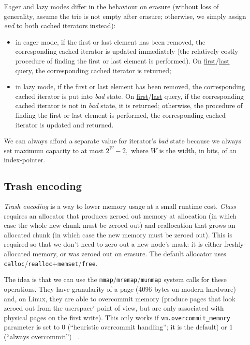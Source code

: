 \documentclass[a4paper,12pt]{article}
\begin{document}
Eager and lazy modes differ in the behaviour on erasure (without loss of generality, assume the trie is not empty after
erasure; otherwise, we simply assign \textit{end} to both cached iterators instead):
\begin{itemize}
    \item in eager mode, if the first or last element has been removed,
          the corresponding cached iterator is updated immediately (the relatively costly procedure of finding the first or last element is performed).
          On \underline{first}/\underline{last} query, the corresponding cached iterator is returned;
    \item in lazy mode, if the first or last element has been removed, the corresponding cached iterator is put into \textit{bad} state.
          On \underline{first}/\underline{last} query, if the corresponding cached iterator is not in \textit{bad} state, it is returned;
          otherwise, the procedure of finding the first or last element is performed, the corresponding cached iterator is updated and returned.
\end{itemize}

We can always afford a separate value for iterator's \textit{bad} state because
we always set maximum capacity to at most $2^W - 2,$ where $W$ is the width, in bits, of an index-pointer.

\subsection{Trash encoding}

\textit{Trash encoding} is a way to lower memory usage at a small runtime cost.
\textit{Glass} requires an allocator that produces zeroed out memory at allocation
(in which case the whole new chunk must be zeroed out)
and reallocation that grows an allocated chunk
(in which case the new memory must be zeroed out).
This is required so that we don't need to zero out a new node's mask: it is either freshly-allocated memory, or was zeroed out on erasure.
The default allocator uses \texttt{calloc}/\texttt{realloc}+\texttt{memset}/\texttt{free}.

The idea is that we can use the \texttt{mmap}/\texttt{mremap}/\texttt{munmap} system calls for these operations.
They have granularity of a page (4096 bytes on modern hardware) and, on Linux, they are able to overcommit memory
(produce pages that look zeroed out from the userspace' point of view, but are only associated with physical pages on the first write).
This only works if \texttt{vm.overcommit\_memory} parameter is set to
0 (``heuristic overcommit handling''; it is the default) or
1 (``always overcommit'')
~\cite{linux_overcommit}.
\end{document}

